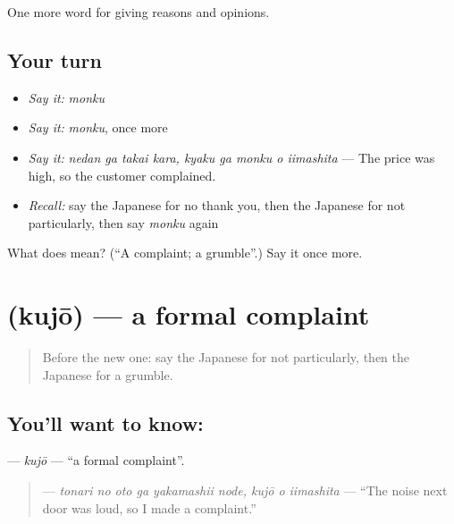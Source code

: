 \begin{grammarlens}[title={What you've built}]
One more word for giving reasons and opinions.
\end{grammarlens}

\subsection*{Your turn}
\begin{itemize}
\raggedright
  \item \emph{Say it:} \emph{monku}
  \item \emph{Say it:} \emph{monku}, once more
  \item \emph{Say it:} \emph{nedan ga takai kara, kyaku ga monku o iimashita} — The price was high, so the customer complained.
  \item \emph{Recall:} say the Japanese for no thank you, then the Japanese for not particularly, then say \emph{monku} again
\end{itemize}

\begin{tcolorbox}[breakable,colback=teal!4,colframe=teal!35!black,title={Before you move on}]
What does  mean? (\textquotedblleft{}A complaint; a grumble\textquotedblright{}.) Say it once more.
\end{tcolorbox}
\section[\texorpdfstring{\ja{くじょう} (kujō)}{くじょう (kujō)}]{ (kujō) — a formal complaint}

\label{lesson:JA-C324-kujou}



\begin{quote}
Before the new one: say the Japanese for not particularly, then the Japanese for a grumble.
\end{quote}

\subsection*{You'll want to know: }
\textbf{} — \emph{kujō} — \textquotedblleft{}a formal complaint\textquotedblright{}.

\begin{quote}
\textbf{   } — \emph{tonari no oto ga yakamashii node, kujō o iimashita} — \textquotedblleft{}The noise next door was loud, so I made a complaint.\textquotedblright{}
\end{quote}

